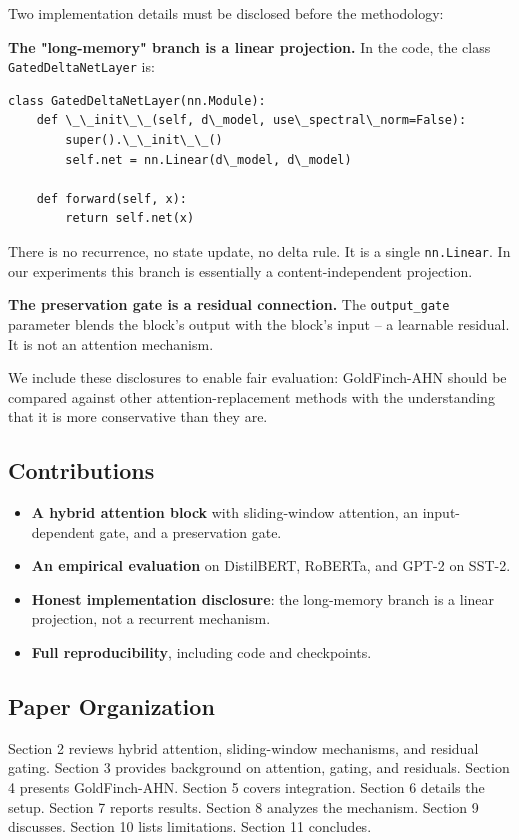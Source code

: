 Two implementation details must be disclosed before the methodology:

\textbf{The "long-memory" branch is a linear projection.} In the code, the class 
\texttt{GatedDeltaNetLayer} is:

\begin{lstlisting}
class GatedDeltaNetLayer(nn.Module):
    def \_\_init\_\_(self, d\_model, use\_spectral\_norm=False):
        super().\_\_init\_\_()
        self.net = nn.Linear(d\_model, d\_model)

    def forward(self, x):
        return self.net(x)
\end{lstlisting}

There is no recurrence, no state update, no delta rule. It is a single 
\texttt{nn.Linear}. In our experiments this branch is essentially a 
content-independent projection.

\textbf{The preservation gate is a residual connection.} The \texttt{output\_gate} 
parameter blends the block's output with the block's input -- a learnable 
residual. It is not an attention mechanism.

We include these disclosures to enable fair evaluation: GoldFinch-AHN 
should be compared against other attention-replacement methods with the 
understanding that it is more conservative than they are.

\subsection{Contributions}

\begin{itemize}
\item \textbf{A hybrid attention block} with sliding-window attention, an input-dependent
  gate, and a preservation gate.
\item \textbf{An empirical evaluation} on DistilBERT, RoBERTa, and GPT-2 on SST-2.
\item \textbf{Honest implementation disclosure}: the long-memory branch is a linear
  projection, not a recurrent mechanism.
\item \textbf{Full reproducibility}, including code and checkpoints.

\end{itemize}
\subsection{Paper Organization}

Section 2 reviews hybrid attention, sliding-window mechanisms, and residual 
gating. Section 3 provides background on attention, gating, and residuals. 
Section 4 presents GoldFinch-AHN. Section 5 covers integration. Section 6 
details the setup. Section 7 reports results. Section 8 analyzes the 
mechanism. Section 9 discusses. Section 10 lists limitations. Section 11 
concludes.



